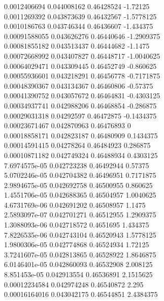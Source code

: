 {0.0012406694 0.044008162 0.46428524 -1.72125\\
0.0011269392 0.043873639 0.46432567 -1.5778125\\
0.0010186763 0.043746344 0.46436607 -1.434375\\
0.00091588055 0.043626276 0.46440646 -1.2909375\\
0.00081855182 0.043513437 0.46444682 -1.1475\\
0.00072668992 0.043407827 0.46448717 -1.0040625\\
0.00064029471 0.043309445 0.46452749 -0.860625\\
0.00055936601 0.043218291 0.46456778 -0.7171875\\
0.00048390367 0.043134367 0.46460806 -0.57375\\
0.00041390752 0.043057672 0.46464831 -0.4303125\\
0.00034937741 0.042988206 0.46468854 -0.286875\\
0.00029031318 0.04292597 0.46472875 -0.1434375\\
0.00023671467 0.042870963 0.46476893 0\\
0.00018858171 0.042823187 0.46480909 0.1434375\\
0.00014591415 0.04278264 0.46484923 0.286875\\
0.00010871182 0.042749324 0.46488934 0.4303125\\
7.6974575e-05 0.042723238 0.46492944 0.57375\\
5.0702246e-05 0.042704382 0.46496951 0.7171875\\
2.9894675e-05 0.042692758 0.46500955 0.860625\\
1.4551706e-05 0.042688365 0.46504957 1.0040625\\
4.6731769e-06 0.042691202 0.46508957 1.1475\\
2.5893097e-07 0.042701271 0.46512955 1.2909375\\
1.3088093e-06 0.042718572 0.4651695 1.434375\\
7.8226535e-06 0.042743104 0.46520943 1.5778125\\
1.9800306e-05 0.042774868 0.46524934 1.72125\\
3.7241607e-05 0.042813865 0.46528922 1.8646875\\
6.0146401e-05 0.042860093 0.46532908 2.008125\\
8.851453e-05 0.042913554 0.46536891 2.1515625\\
0.00012234584 0.042974248 0.46540872 2.295\\
0.00016164016 0.043042175 0.46544851 2.4384375\\
}
